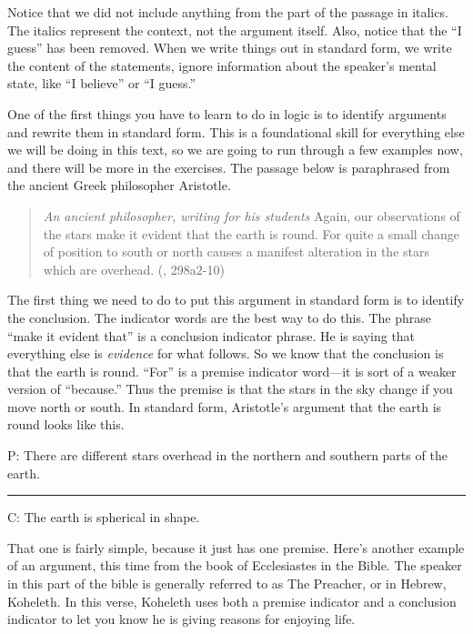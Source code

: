 Notice that we did not include anything from the part of the passage in italics. The italics represent the context, not the argument itself. Also, notice that the ``I guess'' has been removed. When we write things out in standard form, we write the content of the statements, ignore information about the speaker's mental state, like ``I believe'' or ``I guess.'' 

One of the first things you have to learn to do in logic is to identify arguments and rewrite them in standard form. This is a foundational skill for everything else we will be doing in this text, so we are going to run through a few examples now, and there will be more in the exercises. The passage below is paraphrased from the ancient Greek philosopher Aristotle. 

\begin{quotation}\noindent \textit{An ancient philosopher, writing for his students} Again, our observations of the stars make it evident that the earth is round. For quite a small change of position to south or north causes a manifest alteration in the stars which are overhead. (\cite{Aristotle:heavens}, 298a2-10)
\label{on_the_heavens} \end{quotation}

The first thing we need to do to put this argument in standard form is to identify the conclusion. The indicator words are the best way to do this. The phrase ``make it evident that'' is a conclusion indicator phrase. He is saying that everything else is \textit{evidence} for what follows. So we know that the conclusion is that the earth is round. ``For'' is a premise indicator word---it is sort of a weaker version of ``because.''  Thus the premise is that the stars in the sky change if you move north or south. In standard form, Aristotle's argument that the earth is round looks like this.\\


\begin{earg}
\item[P:] There are different stars overhead in the northern and southern parts of the earth.
\vspace{-.5em}
\item [] \rule{0.9\linewidth}{.5pt} 
\item[C:] The earth is spherical in shape. 
\end{earg} 

That one is fairly simple, because it just has one premise. Here's another example of an argument, this time from the book of Ecclesiastes in the Bible. The speaker in this part of the bible is generally referred to as The Preacher, or in Hebrew, Koheleth. In this verse, Koheleth uses both a premise indicator and a conclusion indicator to let you know he is giving reasons for enjoying life.

